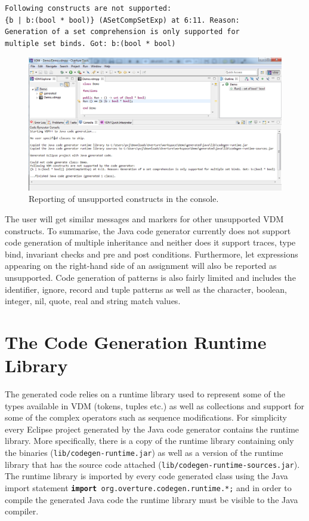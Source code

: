\noindent \texttt{Following constructs are not supported:\\ \{b |
b:(bool * bool)\} (ASetCompSetExp) at 6:11. Reason:\\Generation of a
set comprehension is only supported for\\multiple set binds. Got:
b:(bool * bool)}\\

\begin{figure}[htbp]
\begin{center}
\includegraphics[width=\linewidth]{screenDumps/javacg_unsupported}
\caption{Reporting of unsupported constructs in the
console.\label{fig:javacg_unsupported}}
\end{center}
\end{figure}

The user will get similar messages and markers for other unsupported
VDM constructs. To summarise, the Java code generator currently does
not support code generation of multiple inheritance and neither does
it support traces, type bind, invariant checks and pre and post
conditions. Furthermore, let expressions appearing on the right-hand
side of an assignment will also be reported as unsupported. Code
generation of patterns is also fairly limited and includes the
identifier, ignore, record and tuple patterns as well as the
character, boolean, integer, nil, quote, real and string match values.

\section{The Code Generation Runtime Library}

The generated code relies on a runtime library used to represent some
of the types available in VDM (tokens, tuples etc.) as well as
collections and support for some of the complex operators such as
sequence modifications. For simplicity every Eclipse project generated
by the Java code generator contains the runtime library. More
specifically, there is a copy of the runtime library containing only
the binaries (\texttt{lib/codegen-runtime.jar}) as well as a version
of the runtime library that has the source code attached
(\texttt{lib/codegen-runtime-sources.jar}). The runtime library is
imported by every code generated class using the Java import statement
\texttt{\textbf{import} org.overture.codegen.runtime.*;} and in order
to compile the generated Java code the runtime library must be visible
to the Java compiler.

